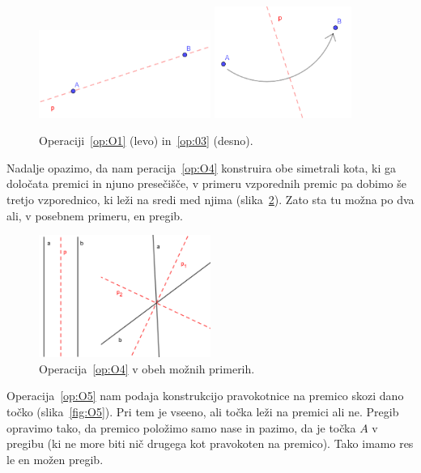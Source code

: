 \begin{figure}[h]
    \centering
    \includegraphics[width=0.5\textwidth]{images/origami_operacije/O1.png}
    \includegraphics[width=0.4\textwidth]{images/origami_operacije/O3.png}
    \caption[Operaciji~\ref{op:O1} in~\ref{op:O3}]{Operaciji~\ref{op:O1} (levo) in~\ref{op:03} (desno).}
    \label{fig:O1_in_O3}
\end{figure}

Nadalje opazimo, da nam peracija~\ref{op:O4} konstruira obe simetrali kota, ki ga določata premici in njuno presečišče, v primeru vzporednih premic pa dobimo še tretjo vzporednico, ki leži na sredi med njima (slika~\ref{fig:O4}). Zato sta tu možna po dva ali, v posebnem primeru, en pregib.

\begin{figure}[h]
    \centering
    \includegraphics[width=0.5\textwidth]{images/origami_operacije/O4.png}
    \caption[Operacija~\ref{op:O4}]{Operacija~\ref{op:O4} v obeh možnih primerih.}
    \label{fig:O4}
\end{figure}

Operacija~\ref{op:O5} nam podaja konstrukcijo pravokotnice na premico skozi dano točko (slika~\ref{fig:O5}). Pri tem je vseeno, ali točka leži na premici ali ne. Pregib opravimo tako, da premico položimo samo nase in pazimo, da je točka $A$ v pregibu (ki ne more biti nič drugega kot pravokoten na premico). Tako imamo res le en možen pregib.

